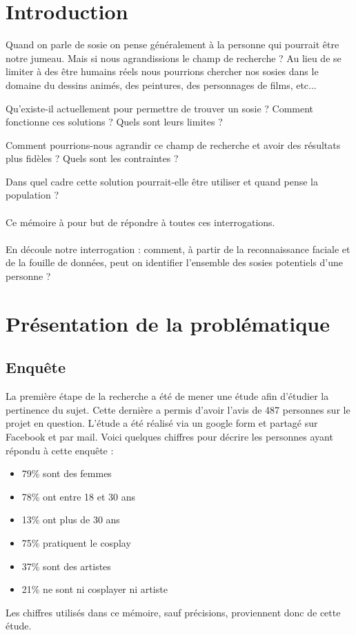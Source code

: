 \documentclass[a4paper,12pt]{article}
\begin{document}
\section*{Introduction}
Quand on parle de sosie on pense généralement à la personne qui pourrait être notre jumeau. Mais si nous agrandissions le champ de recherche ? Au lieu de se limiter à des être humains réels nous pourrions chercher nos sosies dans le domaine du dessins animés, des peintures, des personnages de films, etc... 

Qu'existe-il actuellement pour permettre de trouver un sosie ? Comment fonctionne ces solutions ? Quels sont leurs limites ? 

Comment pourrions-nous agrandir ce champ de recherche et avoir des résultats plus fidèles ? Quels sont les contraintes ? 

Dans quel cadre cette solution pourrait-elle être utiliser et quand pense la population ? 
\\ \\
Ce mémoire à pour but de répondre à toutes ces interrogations.
\\ \\
En découle notre interrogation : comment, à partir de la reconnaissance faciale et de la fouille de données, peut on identifier l’ensemble des sosies potentiels d’une personne ?

\newpage
\section{Présentation de la problématique}
\subsection{Enquête}
La première étape de la recherche a été de mener une étude afin d'étudier la pertinence du sujet.
Cette dernière a permis d'avoir l'avis de 487 personnes sur le projet en question. L'étude a été réalisé via un google form et partagé sur Facebook et par mail. 
Voici quelques chiffres pour décrire les personnes ayant répondu à cette enquête : 
\begin{itemize}
    \item 79\% sont des femmes 
    \item 78\% ont entre 18 et 30 ans
    \item 13\% ont plus de 30 ans
    \item 75\% pratiquent le cosplay
    \item 37\% sont des artistes
    \item 21\% ne sont ni cosplayer ni artiste
\end{itemize}
Les chiffres utilisés dans ce mémoire, sauf précisions, proviennent donc de cette étude. 
\end{document}
